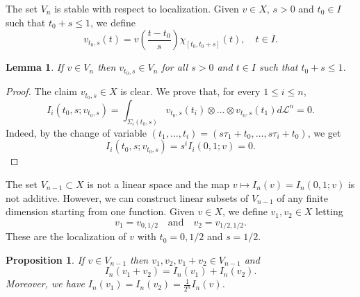 \documentclass[12pt, reqno]{amsart}
\theoremstyle{plain}
\newtheorem {lemma}[theorem]{Lemma}
\newtheorem {proposition} [theorem]{Proposition}
\theoremstyle{definition}
\theoremstyle{remark}
\numberwithin{equation}{section}
\renewcommand{\L}{\mathcal{L}}
\newcommand{\0}{\theta}
\newcommand{\1}{{-1}}
\renewcommand{\=}{\coloneqq}
\renewcommand{\.}{\dots}
\newcommand{\be}{\begin{equation}}
\newcommand{\ee}{\end{equation}}
\begin{document}
The set $V_n$ is  stable   with respect to localization.
Given $v\in X $, $s>0$ and $t_0\in I$ such that $t_0+s\leq 1$, we define 
 \begin{equation}\label{vs}
  v_{t_0,s}(t) =v\left(\frac{t-t_0}{s}\right) \chi_{[t_0,t_0+s]}(t) ,\quad   t\in I.
 \end{equation}

 

\begin{lemma}\label{lemma:decomposeN}
	If $v\in V_n$ then  $ v_{t_0,s}\in V_n$ for all $s>0$ and $t\in I$ such that   $ t_0+s\leq 1 $. 
\end{lemma}




\begin{proof}
The claim $ v_{t_0,s} \in X$ is clear. We prove that, for every $1\le i\le n$,
	\be\label{eq:rag}
	I _i ( t_0,s ;v_{t_0,s}) = 	\int_{\Sigma_i( t_0,s) } v_{t_0,s}(t_i) \otimes\dots\otimes v_{t_0,s}(t_1)d\L^n=0.
	\ee
	Indeed, by the change of variable  $
		(t_1,\dots, t_i)= (s \tau _1+t_0  ,\dots, s \tau _i+t_0)$, we get 
			\[
		I _i ( t_0,s ;v_{t_0,s})  = s^i  I_i(0,1;v)=0 .
	\] 
\end{proof} 
The set $V_{n-1} \subset X$ is not a linear space and the map $v\mapsto I_n(v) = I_n(0,1;v)$ is not additive. 
However, we can construct linear subsets of $V_{n-1}$  of any finite dimension starting from one function.
Given  $v\in X$, we define $v_1,v_2\in X$ letting
\[
  v_1 = v_{0,1/2}\quad \textrm{and}\quad
  v_2 = v_{1/2,1/2}.
\]
These are the localization of $v$ with $t_0=0,1/2$ and $s=1/2$.


\begin{proposition} \label{ITER} If $v\in V_{n-1}$ then $v_1,v_2,v_1+v_2\in V_{n-1}$ and
\[ 
   I_n(v_1+v_2)= I_n(v_1)+  I_n(v_2).
\]
Moreover, we have  $ I_n(v_1)=  I_n(v_2) = \frac{1}{2^n} I_n(v)$.
\end{proposition}
\end{document}
